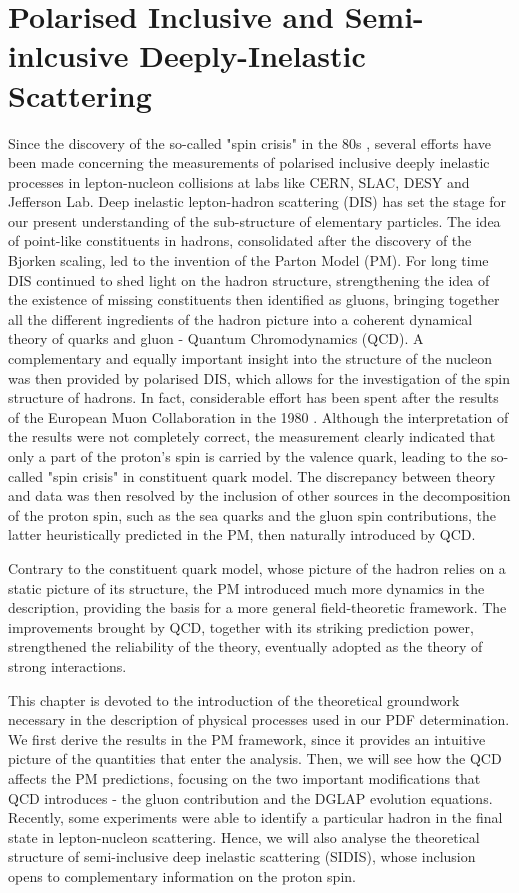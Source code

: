 \chapter{Polarised Inclusive and Semi-inlcusive Deeply-Inelastic Scattering}
\label{ch:2}


Since the discovery of the so-called "spin crisis" in the 80s \cite{Leader_Anselmino}, several efforts have been made concerning the measurements of polarised inclusive deeply inelastic processes in lepton-nucleon collisions at labs like CERN, SLAC, DESY and Jefferson Lab. Deep inelastic lepton-hadron scattering (DIS) has set the stage for our present understanding of the sub-structure of elementary particles. The idea of point-like constituents in hadrons, consolidated after the discovery of the Bjorken scaling, led to the invention of the Parton Model (PM). For long time DIS continued to shed light on the hadron structure, strengthening the idea of the existence of missing constituents then identified as gluons, bringing together all the different ingredients of the hadron picture into a coherent dynamical theory of quarks and gluon - Quantum Chromodynamics (QCD). A complementary and equally important insight into the structure of the nucleon was then provided by polarised DIS, which allows for the investigation of the spin structure of hadrons. In fact, considerable effort has been spent after the results of the European Muon Collaboration in the 1980 \cite{EuropeanMuon:1989yki}. Although the interpretation of the results were not completely correct, the measurement clearly indicated that only a part of the proton's spin is carried by the valence quark, leading to the so-called "spin crisis" in constituent quark model. The discrepancy between theory and data was then resolved by the inclusion of other sources in the decomposition of the proton spin, such as the sea quarks and the gluon spin contributions, the latter heuristically predicted in the PM, then naturally introduced by QCD.\par
Contrary to the constituent quark model, whose picture of the hadron relies on a static picture of its structure, the PM introduced much more dynamics in the description, providing the basis for a more general field-theoretic framework. The improvements brought by QCD, together with its striking prediction power, strengthened the reliability of the theory, eventually adopted as the theory of strong interactions.\par
This chapter is devoted to the introduction of the theoretical groundwork necessary in the description of physical processes used in our PDF determination. We first derive the results in the PM framework, since it provides an intuitive picture of the quantities that enter the analysis. Then, we will see how the QCD affects the PM predictions, focusing on the two important modifications that QCD introduces - the gluon contribution and the DGLAP evolution equations. Recently, some experiments were able to identify a particular hadron in the final state in lepton-nucleon scattering. Hence, we will also analyse the theoretical structure of semi-inclusive deep inelastic scattering (SIDIS), whose inclusion opens to complementary information on the proton spin.

